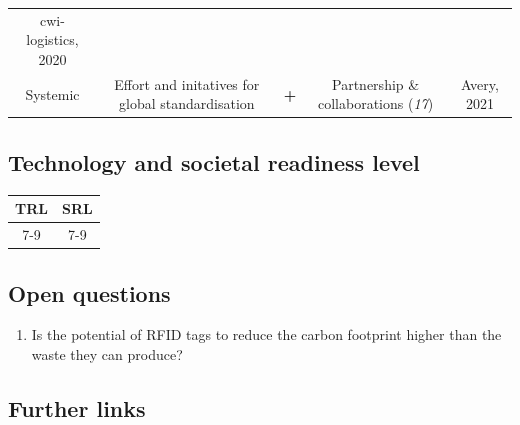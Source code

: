 \documentclass[
]{book}
\providecommand{\tightlist}{%
  \setlength{\itemsep}{0pt}\setlength{\parskip}{0pt}}
\begin{document}
\begin{longtable}[]{@{}ccccc@{}}
\begin{minipage}[t]{0.17\columnwidth}
cwi-logistics, 2020\strut
\end{minipage}\tabularnewline
\begin{minipage}[t]{0.17\columnwidth}\centering
Systemic\strut
\end{minipage} & \begin{minipage}[t]{0.16\columnwidth}\centering
Effort and initatives for global standardisation\strut
\end{minipage} & \begin{minipage}[t]{0.17\columnwidth}\centering
\textbf{+}\strut
\end{minipage} & \begin{minipage}[t]{0.17\columnwidth}\centering
Partnership \& collaborations (\emph{17})\strut
\end{minipage} & \begin{minipage}[t]{0.17\columnwidth}\centering
Avery, 2021\strut
\end{minipage}\tabularnewline
\bottomrule
\end{longtable}

\hypertarget{technology-and-societal-readiness-level-28}{%
\subsection*{Technology and societal readiness level}\label{technology-and-societal-readiness-level-28}}

\begin{longtable}[]{@{}cc@{}}
\toprule
TRL & SRL\tabularnewline
\midrule
\endhead
7-9 & 7-9\tabularnewline
\bottomrule
\end{longtable}

\hypertarget{open-questions-28}{%
\subsection*{Open questions}\label{open-questions-28}}

\begin{enumerate}
\def\labelenumi{\arabic{enumi}.}
\tightlist
\item
  Is the potential of RFID tags to reduce the carbon footprint higher than the waste they can produce?
\end{enumerate}

\hypertarget{further-links-25}{%
\subsection*{Further links}\label{further-links-25}}
\end{document}
